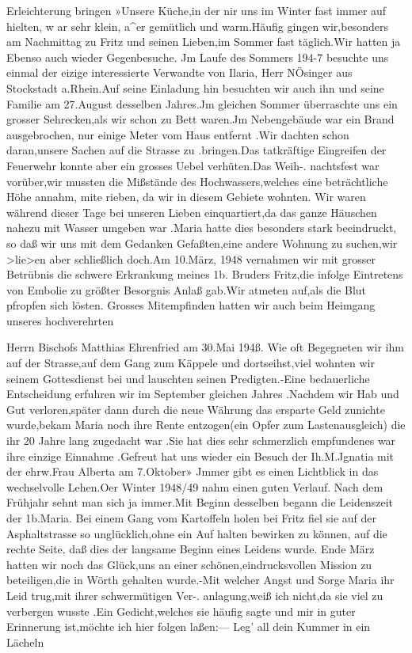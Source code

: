 \documentclass[a4paper,11pt]{article}
\begin{document}
 Erleichterung bringen »Unsere Küche,in der nir uns im Winter fast immer auf hielten, w ar sehr klein, a^er gemütlich und warm.Häufig gingen wir,besonders am Nachmittag zu Fritz und seinen Lieben,im Sommer fast täglich.Wir hatten ja Ebenso auch wieder Gegenbesuche. Jm Laufe des Sommers 194-7 besuchte uns einmal der eizige interessierte Verwandte von Ilaria, Herr NÖsinger aus Stockstadt a.Rhein.Auf seine Einladung hin besuchten wir auch ihn und seine Familie am 27.August desselben Jahres.Jm gleichen Sommer überraschte uns ein grosser Sehrecken,als wir schon zu Bett waren.Jm Nebengebäude war ein Brand ausgebrochen, nur einige Meter vom Haus entfernt .Wir dachten schon daran,unsere Sachen auf die Strasse zu .bringen.Das tatkräftige Eingreifen der Feuerwehr konnte aber ein grosses Uebel verhüten.Das Weih-. nachtsfest war vorüber,wir mussten die Mißstände des Hochwassers,welches eine beträchtliche Höhe annahm, mite rieben, da wir in diesem Gebiete wohnten. Wir waren während dieser Tage bei unseren Lieben einquartiert,da das ganze Häuschen nahezu mit Wasser umgeben war .Maria hatte dies besonders stark beeindruckt, so daß wir uns mit dem Gedanken Gefaßten,eine andere Wohnung zu suchen,wir >lie>en aber schließlich doch.Am 10.März, 1948 vernahmen wir mit grosser Betrübnis die schwere Erkrankung meines 1b. Bruders Fritz,die infolge Eintretens von Embolie zu größter Besorgnis Anlaß gab.Wir atmeten auf,als die Blut pfropfen sich lösten. Grosses Mitempfinden hatten wir auch beim Heimgang unseres hochverehrten

 Herrn Bischofs Matthias Ehrenfried am 30.Mai 194ß. Wie oft Begegneten wir ihm auf der Strasse,auf dem Gang zum Käppele und dortseihst,viel wohnten wir seinem Gottesdienst bei und lauschten seinen Predigten.-Eine bedauerliche Entscheidung erfuhren wir im September gleichen Jahres .Nachdem wir Hab und Gut verloren,später dann durch die neue Währung das ersparte Geld zunichte wurde,bekam Maria noch ihre Rente entzogen(ein Opfer zum Lastenausgleich) die ihr 20 Jahre lang zugedacht war .Sie hat dies sehr schmerzlich empfundenes war ihre einzige Einnahme .Gefreut hat uns wieder ein Besuch der Ih.M.Jgnatia mit der ehrw.Frau Alberta am 7.Oktober» Jmmer gibt es einen Lichtblick in das wechselvolle Lehen.Oer Winter 1948/49 nahm einen guten Verlauf. Nach dem Frühjahr sehnt man sich ja immer.Mit Beginn desselben begann die Leidenszeit der 1b.Maria. Bei einem Gang vom Kartoffeln holen bei Fritz fiel sie auf der Asphaltstrasse so unglücklich,ohne ein Auf halten bewirken zu können, auf die rechte Seite, daß dies der langsame Beginn eines Leidens wurde. Ende März hatten wir noch das Glück,uns an einer schönen,eindrucksvollen Mission zu beteiligen,die in Wörth gehalten wurde.-Mit welcher Angst und Sorge Maria ihr Leid trug,mit ihrer schwermütigen Ver-. anlagung,weiß ich nicht,da sie viel zu verbergen wusste .Ein Gedicht,welches sie häufig sagte und mir in guter Erinnerung ist,möchte ich hier folgen laßen:— Leg' all dein Kummer in ein Lächeln
\end{document}
